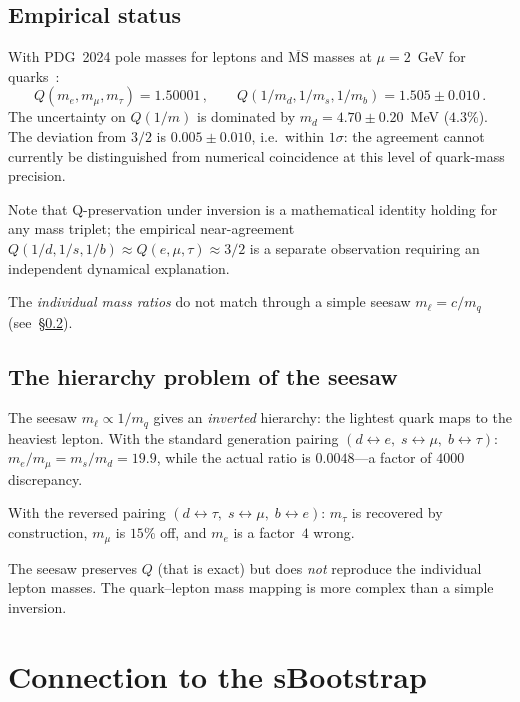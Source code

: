 \documentclass[11pt,a4paper]{article}
\theoremstyle{definition}\newtheorem{exercise}{Exercise}[section]
\begin{document}
\subsection{Empirical status}

With PDG~2024 pole masses for leptons and $\overline{\text{MS}}$
masses at $\mu = 2$~GeV for quarks~\cite{AHS2025}:
\begin{equation}
  Q(m_e,m_\mu,m_\tau) = 1.50001\,,\qquad
  Q(1/m_d,1/m_s,1/m_b) = 1.505 \pm 0.010\,.
\end{equation}
The uncertainty on $Q(1/m)$ is dominated by $m_d = 4.70 \pm 0.20$~MeV
($4.3\%$).  The deviation from $3/2$ is $0.005 \pm 0.010$, i.e.\
within $1\sigma$: the agreement cannot currently be distinguished
from numerical coincidence at this level of quark-mass precision.

Note that Q-preservation under inversion is a mathematical identity
holding for any mass triplet; the empirical near-agreement
$Q(1/d,1/s,1/b) \approx Q(e,\mu,\tau) \approx 3/2$ is a separate
observation requiring an independent dynamical explanation.

The \emph{individual mass ratios} do not match through a simple
seesaw $m_\ell = c/m_q$ (see~\S\ref{sec:caveats}).

\subsection{The hierarchy problem of the seesaw}
\label{sec:caveats}

The seesaw $m_\ell \propto 1/m_q$ gives an \emph{inverted}
hierarchy: the lightest quark maps to the heaviest lepton.
With the standard generation pairing $(d \leftrightarrow e,\;
s \leftrightarrow \mu,\; b \leftrightarrow \tau)$:
$m_e/m_\mu = m_s/m_d = 19.9$, while the actual ratio is
$0.0048$---a factor of $4000$ discrepancy.

With the reversed pairing $(d \leftrightarrow \tau,\;
s \leftrightarrow \mu,\; b \leftrightarrow e)$: $m_\tau$
is recovered by construction, $m_\mu$ is $15\%$ off, and
$m_e$ is a factor~$4$ wrong.

The seesaw preserves $Q$ (that is exact) but does \emph{not}
reproduce the individual lepton masses.  The quark--lepton
mass mapping is more complex than a simple inversion.

\section{Connection to the sBootstrap}
\label{sec:sbootstrap}
\end{document}
